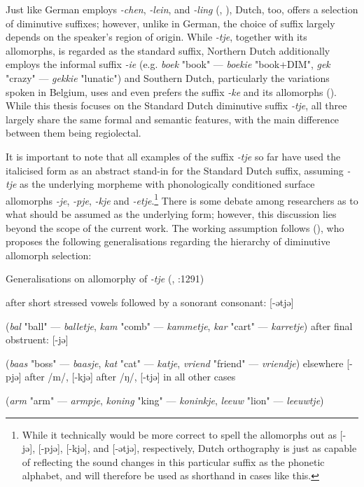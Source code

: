 Just like German employs \textit{-chen}, \textit{-lein}, and \textit{-ling} (\citeauthor{Alexiadou+Lohndal}, \citeyear{Alexiadou+Lohndal}), Dutch, too, offers a selection of diminutive suffixes; however, unlike in German, the choice of suffix largely depends on the speaker's region of origin. While \textit{-tje}, together with its allomorphs, is regarded as the standard suffix, Northern Dutch additionally employs the informal suffix \textit{-ie} (e.g. \textit{boek} "book" --- \textit{boekie} "book+DIM", \textit{gek} "crazy" --- \textit{gekkie} "lunatic") and Southern Dutch, particularly the variations spoken in Belgium, uses and even prefers the suffix \textit{-ke} and its allomorphs (\cite{Vandekerckhove+2005}). While this thesis focuses on the Standard Dutch diminutive suffix \textit{-tje}, all three largely share the same formal and semantic features, with the main difference between them being regiolectal.

It is important to note that all examples of the suffix \textit{-tje} so far have used the italicised form as an abstract stand-in for the Standard Dutch suffix, assuming \textit{-tje} as the underlying morpheme with phonologically conditioned surface allomorphs \textit{-je}, \textit{-pje}, \textit{-kje} and \textit{-etje}.\footnote{While it technically would be more correct to spell the allomorphs out as [-jə], [-pjə], [-kjə], and [-ətjə], respectively, Dutch orthography is just as capable of reflecting the sound changes in this particular suffix as the phonetic alphabet, and will therefore be used as shorthand in cases like this.} There is some debate among researchers as to what should be assumed as the underlying form; however, this discussion lies beyond the scope of the current work. The working assumption follows \citeauthor{VanderHulst+2008} (\citeyear{VanderHulst+2008}), who proposes the following generalisations regarding the hierarchy of diminutive allomorph selection:

\begin{exe}
\ex \label{ex:tjeallo}
Generalisations on allomorphy of \textit{-tje} (\citeauthor{VanderHulst+2008}, \citeyear{VanderHulst+2008}:1291)
\begin{xlist}
\ex after short stressed vowels followed by a sonorant consonant: [-ətjə] \par
(\textit{bal} "ball" --- \textit{balletje}, \textit{kam} "comb" --- \textit{kammetje}, \textit{kar} "cart" --- \textit{karretje})
\ex after final obstruent: [-jə] \par
(\textit{baas} "boss" --- \textit{baasje}, \textit{kat} "cat" --- \textit{katje}, \textit{vriend} "friend" --- \textit{vriendje})
\ex elsewhere [-pjə] after /m/, [-kjə] after /ŋ/, [-tjə] in all other cases \par
(\textit{arm} "arm" --- \textit{armpje}, \textit{koning} "king" --- \textit{koninkje}, \textit{leeuw} "lion" --- \textit{leeuwtje})
\end{xlist}
\end{exe}

